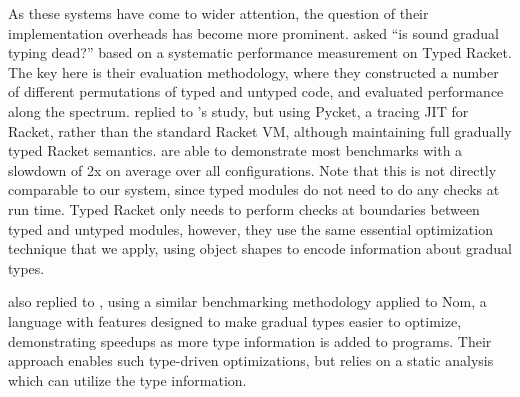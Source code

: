 As these systems have come to wider attention, the question of their
implementation overheads has become more prominent.  
\citet{Takikawa2016} asked ``is sound gradual typing
dead?'' based on a systematic performance measurement on Typed Racket.
The key here is their evaluation methodology, where they constructed a
number of different permutations of typed and untyped code, and
evaluated performance along the spectrum.
\citet{Bauman2017} replied to \citeauthor{Takikawa2016}'s study, but
using Pycket\citep{Pycket2015}, a tracing JIT for Racket, rather
than the standard Racket VM, although maintaining full gradually typed
Racket semantics. \citeauthor{Bauman2017} are able to demonstrate most benchmarks
with a slowdown of 2x on average over all configurations.
Note that this is not directly comparable to our system,
since typed modules do not need to do any checks at run time.
Typed Racket only needs to perform checks at boundaries between typed and untyped modules,
however, they use the same essential optimization technique that we apply,
using object shapes to encode information about gradual types.


\citet{Muehlboeck2017} also replied to \citeauthor{Takikawa2016}, 
using a similar benchmarking methodology applied to Nom, a language
with features designed to make gradual types easier to optimize, 
demonstrating speedups as more type information is added to programs.
Their approach enables such type-driven optimizations,
but relies on a static analysis which can utilize the type information.





